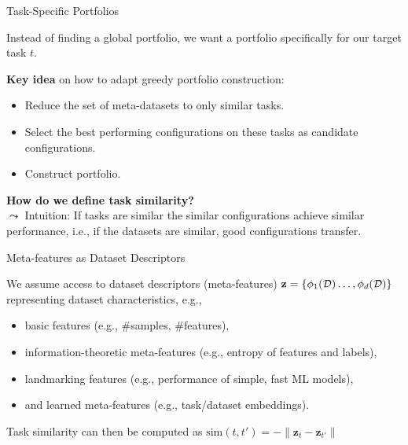 \documentclass[main]{subfiles}
\begin{document}
\begin{frame}{Task-Specific Portfolios}

Instead of finding a global portfolio, we want a portfolio specifically for our target task $t$.

\vspace{0.5cm}
\textbf{Key idea} on how to adapt greedy portfolio construction:
\begin{itemize}
    \item Reduce the set of meta-datasets to only similar tasks.
    \item Select the best performing configurations on these tasks as candidate configurations.
    \item Construct portfolio.
\end{itemize}
\vspace{0.5cm}

\textbf{How do we define task similarity?} \\
\pause
$\leadsto$ Intuition: If tasks are similar the similar configurations achieve similar performance, i.e., if the datasets are similar, good configurations transfer.

\end{frame}
\begin{frame}{Meta-features as Dataset Descriptors}

We assume access to dataset descriptors (meta-features) $\mathbf{z} = \{\phi_1(\mathcal{D}) \dots, \phi_d(\mathcal{D})\}$ representing dataset characteristics, e.g.,
\begin{itemize}
    \item basic features (e.g., \#samples, \#features),
    \item information-theoretic meta-features (e.g., entropy of features and labels),
    \item landmarking features (e.g., performance of simple, fast ML models),
    \item and learned meta-features (e.g., task/dataset embeddings).
\end{itemize}
Task similarity can then be computed as $\text{sim}(t, t') = -\| \mathbf{z}_t - \mathbf{z}_{t'}\|$
\end{frame}
\end{document}
